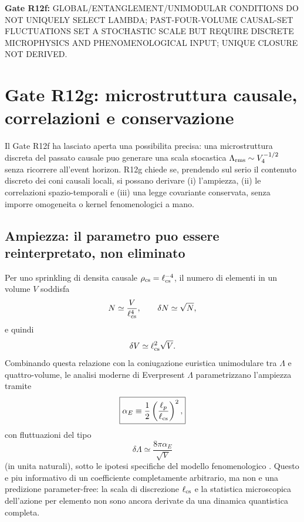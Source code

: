 \documentclass[11pt,a4paper]{article}
\newcommand{\status}[1]{\textsf{#1}}
\begin{document}
\textbf{Gate R12f:} \status{GLOBAL/ENTANGLEMENT/UNIMODULAR CONDITIONS DO NOT UNIQUELY SELECT LAMBDA; PAST-FOUR-VOLUME CAUSAL-SET FLUCTUATIONS SET A STOCHASTIC SCALE BUT REQUIRE DISCRETE MICROPHYSICS AND PHENOMENOLOGICAL INPUT; UNIQUE CLOSURE NOT DERIVED}.


\section{Gate R12g: microstruttura causale, correlazioni e conservazione}

Il Gate R12f ha lasciato aperta una possibilita precisa: una microstruttura discreta del passato causale puo generare una scala stocastica $\Lambda_{\rm rms}\sim V_4^{-1/2}$ senza ricorrere all'event horizon. R12g chiede se, prendendo sul serio il contenuto discreto dei coni causali locali, si possano derivare (i) l'ampiezza, (ii) le correlazioni spazio-temporali e (iii) una legge covariante conservata, senza imporre omogeneita o kernel fenomenologici a mano.

\subsection{Ampiezza: il parametro puo essere reinterpretato, non eliminato}

Per uno sprinkling di densita causale $\rho_{\rm cs}=\ell_{\rm cs}^{-4}$, il numero di elementi in un volume $V$ soddisfa
\begin{equation}
 N\simeq \frac{V}{\ell_{\rm cs}^4},\qquad \delta N\simeq\sqrt N,
\end{equation}
e quindi
\begin{equation}
 \delta V\simeq \ell_{\rm cs}^2\sqrt V.
\end{equation}
Combinando questa relazione con la coniugazione euristica unimodulare tra $\Lambda$ e quattro-volume, le analisi moderne di Everpresent $\Lambda$ parametrizzano l'ampiezza tramite
\begin{equation}
 \boxed{\alpha_E\equiv\frac12\left(\frac{\ell_p}{\ell_{\rm cs}}\right)^2,}
 \label{eq:r12g_alphaE}
\end{equation}
con fluttuazioni del tipo
\begin{equation}
 \delta\Lambda\simeq \frac{8\pi\alpha_E}{\sqrt V}
 \label{eq:r12g_deltaLambda_amp}
\end{equation}
(in unita naturali), sotto le ipotesi specifiche del modello fenomenologico \cite{DasNasiriYazdiPartI2023}. Questo e piu informativo di un coefficiente completamente arbitrario, ma non e una predizione parameter-free: la scala di discrezione $\ell_{\rm cs}$ e la statistica microscopica dell'azione per elemento non sono ancora derivate da una dinamica quantistica completa.
\end{document}
